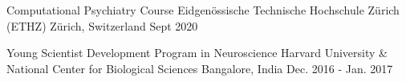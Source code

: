 

\begin{cventries}
\bigskip
  \cventryEdSS
    {Computational Psychiatry Course}
    {Eidgenössische Technische Hochschule Zürich (ETHZ)}
    {Zürich, Switzerland} %
    {Sept 2020} %
    {}
    
\cventryEdSS
    {Young Scientist Development Program in Neuroscience}
    {Harvard University \& National Center for Biological Sciences }
    {Bangalore, India} %
    {Dec. 2016 - Jan. 2017} %
    {} 
 
  \smallskip
\end{cventries}